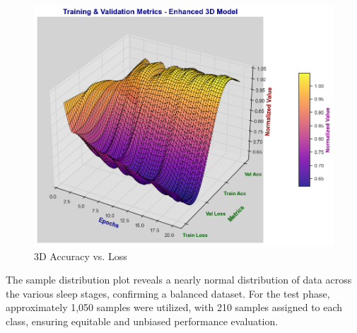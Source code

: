 \begin{figure}[htbp]
	\centering
	\begin{minipage}[b]{0.45\linewidth}
		\includegraphics[width=\linewidth]{img/paper_3/3D acc loss plot}
		\caption{3D Accuracy vs. Loss}
		\label{fig:3d-acc-loss-plot}
	\end{minipage}
\end{figure}


The sample distribution plot reveals a nearly normal distribution of data across the various sleep stages, confirming a balanced dataset. For the test phase, approximately 1,050 samples were utilized, with 210 samples assigned to each class, ensuring equitable and unbiased performance evaluation.


